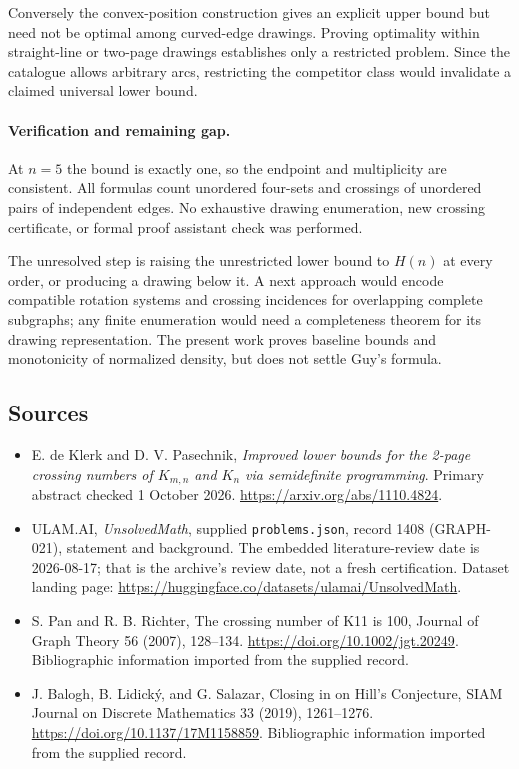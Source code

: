 \documentclass[11pt,a4paper]{article}
\begin{document}
Conversely the convex-position construction gives an explicit upper bound but need not be optimal among curved-edge drawings. Proving optimality within straight-line or two-page drawings establishes only a restricted problem. Since the catalogue allows arbitrary arcs, restricting the competitor class would invalidate a claimed universal lower bound.

\paragraph{Verification and remaining gap.}
At $n=5$ the bound is exactly one, so the endpoint and multiplicity are consistent. All formulas count unordered four-sets and crossings of unordered pairs of independent edges. No exhaustive drawing enumeration, new crossing certificate, or formal proof assistant check was performed.

The unresolved step is raising the unrestricted lower bound to $H(n)$ at every order, or producing a drawing below it. A next approach would encode compatible rotation systems and crossing incidences for overlapping complete subgraphs; any finite enumeration would need a completeness theorem for its drawing representation. The present work proves baseline bounds and monotonicity of normalized density, but does not settle Guy's formula.

\subsection{Sources}

{\small

\begin{itemize}
\item[E1] E. de Klerk and D. V. Pasechnik, \emph{Improved lower bounds for the 2-page crossing numbers of $K_{m,n}$ and $K_n$ via semidefinite programming}. Primary abstract checked 1 October 2026. \url{https://arxiv.org/abs/1110.4824}.


\item[\hypertarget{source:1408:1}{S1}] ULAM.AI, \emph{UnsolvedMath}, supplied \texttt{problems.json}, record 1408 (GRAPH-021), statement and background. The embedded literature-review date is 2026-08-17; that is the archive’s review date, not a fresh certification. Dataset landing page: \url{https://huggingface.co/datasets/ulamai/UnsolvedMath}.

\item[\hypertarget{source:1408:2}{S2}] S. Pan and R. B. Richter, The crossing number of K11 is 100, Journal of Graph Theory 56 (2007), 128–134. \url{https://doi.org/10.1002/jgt.20249}. Bibliographic information imported from the supplied record.

\item[\hypertarget{source:1408:3}{S3}] J. Balogh, B. Lidický, and G. Salazar, Closing in on Hill's Conjecture, SIAM Journal on Discrete Mathematics 33 (2019), 1261–1276. \url{https://doi.org/10.1137/17M1158859}. Bibliographic information imported from the supplied record.

\end{itemize}

}

\label{end:1408}
\end{document}
